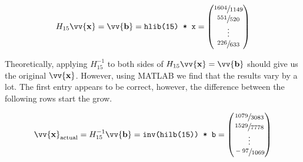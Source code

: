 \documentclass[12pt]{article}
\newcommand{\vect}[1]{\vv{\mathbf{#1}}}
\newcommand{\code}[1]{\texttt{#1}}
\begin{document}
$$
H_{15}\vect{x} = \vect{b} = \code{hlib(15) * x} = \begin{pmatrix*}
    \sfrac{1604}{1149} \\  
    \sfrac{551}{520} \\   
    \vdots \\
    \sfrac{226}{633}   
\end{pmatrix*}
$$

Theoretically, applying $H_{15}^{-1}$ to both sides of $H_{15}\vect{x} = \vect{b}$ should give us the original $\vect{x}$. However, using MATLAB we find that the results vary by a lot. The first entry appears to be correct, however, the difference between the following rows start the grow.

$$
\vect{x}_{\text{actual}} = H_{15}^{-1}\vect{b} = \code{inv(hilb(15)) * b} = \begin{pmatrix*}
    \sfrac{1079}{3083} \\  
    \sfrac{1529}{7778} \\  
    \vdots \\
    \sfrac{-97}{1069}  
\end{pmatrix*}
$$
\end{document}
